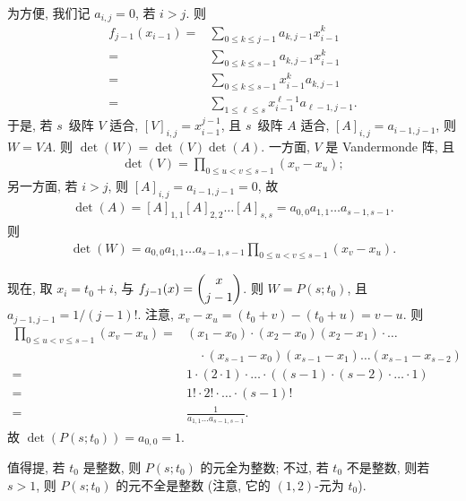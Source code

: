 \documentclass[../libro.tex]{subfiles}
\begin{document}
\begin{example}
    为方便, 我们记 \(a_{i,j} = 0\), 若 \(i > j\).
    则
    \begin{align*}
        f_{j-1} (x_{i-1})
        = {} &
        \sum_{0 \leq k \leq j-1} {a_{k,j-1} x_{i-1}^k}
        \\
        = {} &
        \sum_{0 \leq k \leq s-1} {a_{k,j-1} x_{i-1}^k}
        \\
        = {} &
        \sum_{0 \leq k \leq s-1} {x_{i-1}^k a_{k,j-1}}
        \\
        = {} &
        \sum_{1 \leq \ell \leq s} {x_{i-1}^{\ell-1} a_{\ell-1,j-1}}.
    \end{align*}
    于是, 若 \(s\)~级阵 \(V\) 适合, \([V]_{i,j} = x_{i-1}^{j-1}\),
    且 \(s\)~级阵 \(A\) 适合, \([A]_{i,j} = a_{i-1,j-1}\),
    则 \(W = V A\).
    则 \(\det {(W)} = \det {(V)} \det {(A)}\).
    一方面, \(V\) 是 Vandermonde 阵, 且
    \begin{align*}
        \det {(V)} = \prod_{0 \leq u < v \leq s-1} {(x_v - x_u)};
    \end{align*}
    另一方面, 若 \(i > j\), 则 \([A]_{i,j}= a_{i-1,j-1} = 0\),
    故
    \begin{align*}
        \det {(A)}
        = [A]_{1,1} [A]_{2,2} \dots [A]_{s,s}
        = a_{0,0} a_{1,1} \dots a_{s-1,s-1}.
    \end{align*}
    则
    \begin{align*}
        \det {(W)} = a_{0,0} a_{1,1} \dots a_{s-1,s-1}
        \prod_{0 \leq u < v \leq s-1} {(x_v - x_u)}.
    \end{align*}

    现在, 取 \(x_i = t_0 + i\),
    与 \(f_{j-1} (x) = \dbinom{x}{j-1}\).
    则 \(W = P(s; t_0)\),
    且 \(a_{j-1,j-1} = 1/(j-1)!\).
    注意, \(x_v - x_u = (t_0 + v) - (t_0 + u) = v - u\).
    则
    \begin{align*}
        \prod_{0 \leq u < v \leq s-1} {(x_v - x_u)}
        = {} &
        (x_1 - x_0)
        \cdot (x_2 - x_0) (x_2 - x_1)
        \cdot \dots
        \\
        &
        \quad
        \cdot (x_{s-1} - x_0) (x_{s-1} - x_1) \dots (x_{s-1} - x_{s-2})
        \\
        = {} &
        1 \cdot (2 \cdot 1) \cdot \dots
        \cdot ((s-1) \cdot (s-2) \cdot \dots \cdot 1)
        \\
        = {} &
        1! \cdot 2! \cdot \dots \cdot (s-1)!
        \\
        = {} &
        \frac{1}{a_{1,1} \dots a_{s-1,s-1}}.
    \end{align*}
    故 \(\det {(P(s; t_0))} = a_{0,0} = 1\).

    值得提, 若 \(t_0\) 是整数, 则 \(P(s; t_0)\) 的元全为整数;
    不过, 若 \(t_0\) 不是整数,
    则若 \(s > 1\), 则 \(P(s; t_0)\) 的元不全是整数
    (注意, 它的 \((1, 2)\)-元为 \(t_0\)).
\end{example}
\end{document}
